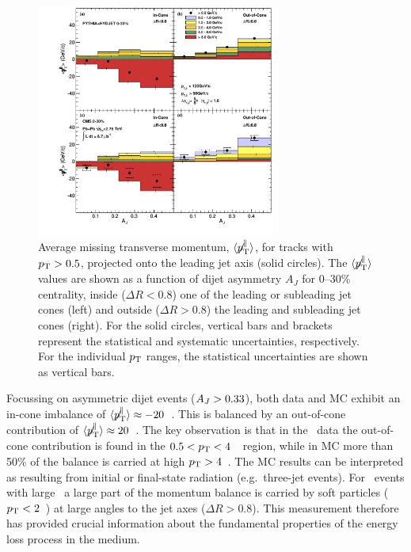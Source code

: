 \begin{figure}[!ht]
\begin{center}
\includegraphics[width=0.7\textwidth]{jetfigures/missingPtParallel-Corrected-data-InConeOutConeDPhiCut_ntv6_2.pdf}
\caption{Average missing transverse momentum,
$\langle \displaystyle{\not} p_{\mathrm{T}}^{\parallel} \rangle$,
for tracks with $\mbox{$p_{\mathrm{T}}$} > 0.5$\GeVc, projected onto the leading jet axis (solid circles).
The $\langle \displaystyle{\not} p_{\mathrm{T}}^{\parallel} \rangle$ values are
shown as a function of dijet asymmetry
$A_J$ for 0--30\% centrality, inside ($\Delta R < 0.8$) one of the leading or subleading jet cones (left) and
outside ($\Delta R > 0.8$) the leading and subleading jet cones (right).
For the solid circles, vertical bars and brackets represent
the statistical and systematic uncertainties, respectively.
For the individual $\mbox{$p_{\mathrm{T}}$}$ ranges, the statistical uncertainties are shown as vertical bars. }
\label{fig:GR:CMS_missingpT}
\end{center}
\end{figure}

Focussing on asymmetric dijet events ($A_J > 0.33$), both data and MC exhibit an
 in-cone imbalance of $\langle \displaystyle{\not} p_{\mathrm{T}}^{\parallel} \rangle \approx
-20$~\GeVc. This is balanced by an out-of-cone contribution of
$\langle \displaystyle{\not} p_{\mathrm{T}}^{\parallel} \rangle \approx 20$~\GeVc. The key
observation is that in the \PbPb\ data the out-of-cone contribution is found in the $0.5 < \mbox{$p_{\mathrm{T}}$} < 4$~\GeVc\ region,
while in MC more than 50\% of the balance is carried at high $\mbox{$p_{\mathrm{T}}$} > 4$~\GeVc. The MC
results can be interpreted as resulting from initial or final-state radiation (e.g.\ three-jet events).
For \PbPb\ events with large \AJ\ a large part of the momentum balance is
carried by soft particles ($\mbox{$p_{\mathrm{T}}$} < 2$~\GeVc) at large angles to the jet axes ($\Delta R > 0.8$). This measurement
therefore has provided crucial information about the fundamental properties of the energy loss process
in the medium.

